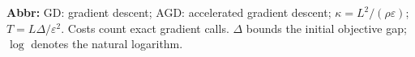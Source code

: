 \begin{table}[tp]
\begin{threeparttable}
\begin{tabularx}{\linewidth}{@{}>{\raggedright\arraybackslash}p{0.20\linewidth}>{\raggedright\arraybackslash}p{0.32\linewidth}>{\raggedright\arraybackslash}p{0.25\linewidth}>{\raggedright\arraybackslash}X@{}}
\bottomrule
\end{tabularx}
\begin{tablenotes}[flushleft]\footnotesize
\item[] \textbf{Abbr:} GD: gradient descent; AGD: accelerated gradient descent; $\kappa=L^2/(\rho\varepsilon)$; $T=L\Delta/\varepsilon^2$. Costs count exact gradient calls. $\Delta$ bounds the initial objective gap; $\log$ denotes the natural logarithm.
\end{tablenotes}
\end{threeparttable}
\end{table}
\clearpage
